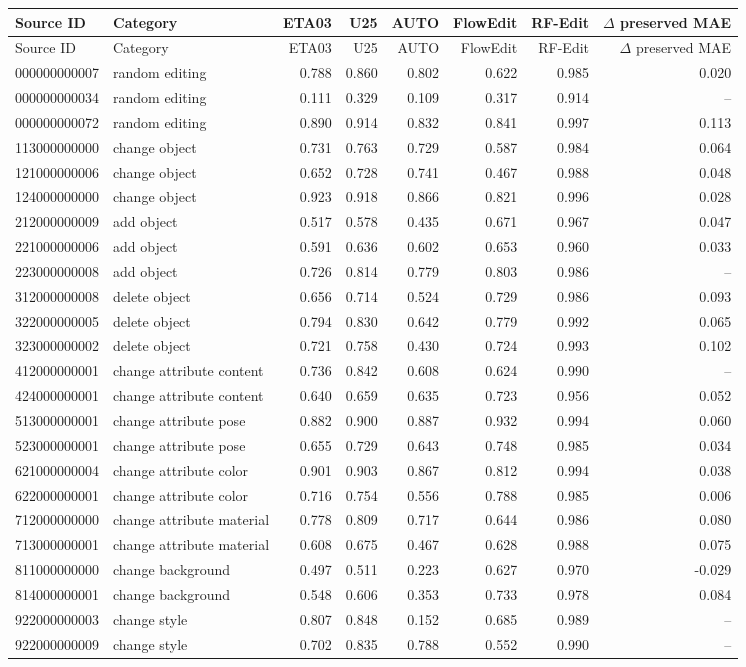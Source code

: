 \begin{longtable}{llrrrrrr}
\toprule
Source ID & Category & ETA03 & U25 & AUTO & FlowEdit & RF-Edit & $\Delta$ preserved MAE\\
\midrule\endfirsthead
\toprule
Source ID & Category & ETA03 & U25 & AUTO & FlowEdit & RF-Edit & $\Delta$ preserved MAE\\
\midrule\endhead
000000000007 & random editing & 0.788 & 0.860 & 0.802 & 0.622 & 0.985 & 0.020\\
000000000034 & random editing & 0.111 & 0.329 & 0.109 & 0.317 & 0.914 & --\\
000000000072 & random editing & 0.890 & 0.914 & 0.832 & 0.841 & 0.997 & 0.113\\
113000000000 & change object & 0.731 & 0.763 & 0.729 & 0.587 & 0.984 & 0.064\\
121000000006 & change object & 0.652 & 0.728 & 0.741 & 0.467 & 0.988 & 0.048\\
124000000000 & change object & 0.923 & 0.918 & 0.866 & 0.821 & 0.996 & 0.028\\
212000000009 & add object & 0.517 & 0.578 & 0.435 & 0.671 & 0.967 & 0.047\\
221000000006 & add object & 0.591 & 0.636 & 0.602 & 0.653 & 0.960 & 0.033\\
223000000008 & add object & 0.726 & 0.814 & 0.779 & 0.803 & 0.986 & --\\
312000000008 & delete object & 0.656 & 0.714 & 0.524 & 0.729 & 0.986 & 0.093\\
322000000005 & delete object & 0.794 & 0.830 & 0.642 & 0.779 & 0.992 & 0.065\\
323000000002 & delete object & 0.721 & 0.758 & 0.430 & 0.724 & 0.993 & 0.102\\
412000000001 & change attribute content & 0.736 & 0.842 & 0.608 & 0.624 & 0.990 & --\\
424000000001 & change attribute content & 0.640 & 0.659 & 0.635 & 0.723 & 0.956 & 0.052\\
513000000001 & change attribute pose & 0.882 & 0.900 & 0.887 & 0.932 & 0.994 & 0.060\\
523000000001 & change attribute pose & 0.655 & 0.729 & 0.643 & 0.748 & 0.985 & 0.034\\
621000000004 & change attribute color & 0.901 & 0.903 & 0.867 & 0.812 & 0.994 & 0.038\\
622000000001 & change attribute color & 0.716 & 0.754 & 0.556 & 0.788 & 0.985 & 0.006\\
712000000000 & change attribute material & 0.778 & 0.809 & 0.717 & 0.644 & 0.986 & 0.080\\
713000000001 & change attribute material & 0.608 & 0.675 & 0.467 & 0.628 & 0.988 & 0.075\\
811000000000 & change background & 0.497 & 0.511 & 0.223 & 0.627 & 0.970 & -0.029\\
814000000001 & change background & 0.548 & 0.606 & 0.353 & 0.733 & 0.978 & 0.084\\
922000000003 & change style & 0.807 & 0.848 & 0.152 & 0.685 & 0.989 & --\\
922000000009 & change style & 0.702 & 0.835 & 0.788 & 0.552 & 0.990 & --\\
\bottomrule
\end{longtable}
\normalsize
